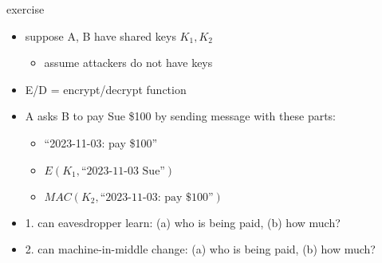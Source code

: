 \begin{frame}{exercise}
    \begin{itemize}
    \item suppose A, B have shared keys $K_1,K_2$
        \begin{itemize}
        \item assume attackers do not have keys
        \end{itemize}
    \item E/D = encrypt/decrypt function
    \item A asks B to pay Sue \$100 by sending message with these parts:
        \begin{itemize}
        \item ``2023-11-03: pay \$100''
        \item $E(K_1, \text{``2023-11-03 Sue''})$
        \item $MAC(K_2, \text{``2023-11-03: pay \$100''})$
        \end{itemize}
    \item 1. can eavesdropper learn: (a) who is being paid, (b) how much?
    \item 2. can machine-in-middle change: (a) who is being paid, (b) how much?
    \end{itemize}
\end{frame}
